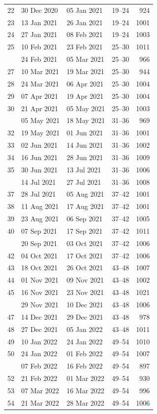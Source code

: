 \documentclass[
  12pt,
  a4paper,
]{article}
\begin{document}
\begin{longtable}[t]{rlllr}
22 & 30 Dec 2020 & 05 Jan 2021 & 19--24 & 924\\
23 & 13 Jan 2021 & 26 Jan 2021 & 19--24 & 1001\\
24 & 27 Jan 2021 & 08 Feb 2021 & 19--24 & 1003\\
25 & 10 Feb 2021 & 23 Feb 2021 & 25--30 & 1011\\
\addlinespace
26 & 24 Feb 2021 & 05 Mar 2021 & 25--30 & 966\\
27 & 10 Mar 2021 & 19 Mar 2021 & 25--30 & 944\\
28 & 24 Mar 2021 & 06 Apr 2021 & 25--30 & 1004\\
29 & 07 Apr 2021 & 19 Apr 2021 & 25--30 & 1004\\
30 & 21 Apr 2021 & 05 May 2021 & 25--30 & 1003\\
\addlinespace
31 & 05 May 2021 & 18 May 2021 & 31--36 & 969\\
32 & 19 May 2021 & 01 Jun 2021 & 31--36 & 1001\\
33 & 02 Jun 2021 & 14 Jun 2021 & 31--36 & 1002\\
34 & 16 Jun 2021 & 28 Jun 2021 & 31--36 & 1009\\
35 & 30 Jun 2021 & 13 Jul 2021 & 31--36 & 1006\\
\addlinespace
36 & 14 Jul 2021 & 27 Jul 2021 & 31--36 & 1008\\
37 & 28 Jul 2021 & 05 Aug 2021 & 37--42 & 1001\\
38 & 11 Aug 2021 & 17 Aug 2021 & 37--42 & 1001\\
39 & 23 Aug 2021 & 06 Sep 2021 & 37--42 & 1005\\
40 & 07 Sep 2021 & 17 Sep 2021 & 37--42 & 1011\\
\addlinespace
41 & 20 Sep 2021 & 03 Oct 2021 & 37--42 & 1006\\
42 & 04 Oct 2021 & 17 Oct 2021 & 37--42 & 1006\\
43 & 18 Oct 2021 & 26 Oct 2021 & 43--48 & 1007\\
44 & 01 Nov 2021 & 09 Nov 2021 & 43--48 & 1002\\
45 & 16 Nov 2021 & 23 Nov 2021 & 43--48 & 1021\\
\addlinespace
46 & 29 Nov 2021 & 10 Dec 2021 & 43--48 & 1006\\
47 & 14 Dec 2021 & 29 Dec 2021 & 43--48 & 978\\
48 & 27 Dec 2021 & 05 Jan 2022 & 43--48 & 1011\\
49 & 10 Jan 2022 & 24 Jan 2022 & 49--54 & 1010\\
50 & 24 Jan 2022 & 01 Feb 2022 & 49--54 & 1007\\
\addlinespace
51 & 07 Feb 2022 & 16 Feb 2022 & 49--54 & 897\\
52 & 21 Feb 2022 & 01 Mar 2022 & 49--54 & 930\\
53 & 07 Mar 2022 & 16 Mar 2022 & 49--54 & 996\\
54 & 21 Mar 2022 & 28 Mar 2022 & 49--54 & 1006\\
\bottomrule
\end{longtable}
\end{document}
